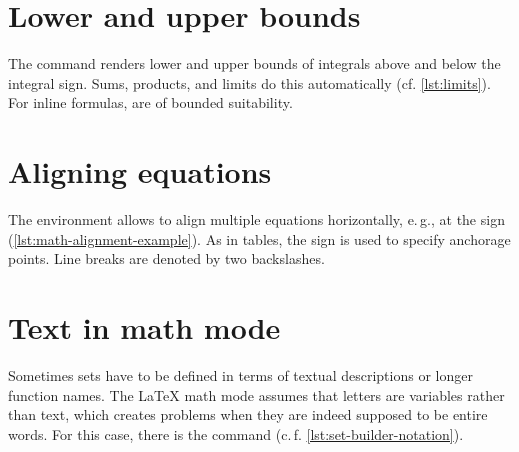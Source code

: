 \section{Lower and upper bounds}

The  command renders lower and upper bounds of integrals above and below the integral sign.
Sums, products, and limits do this 
automatically (cf. \cref{lst:limits}).
For inline formulas,  are of bounded suitability.


\section{Aligning equations}

The  environment allows to align multiple equations horizontally, e.\,g., at the \mono{=} sign (\cref{lst:math-alignment-example}).
As in tables, the \mono{\&} sign is used to specify anchorage points.
Line breaks are denoted by two backslashes.


\section{Text in math mode}

Sometimes sets have to be defined in terms of textual descriptions or longer function names.
The \LaTeX{} math mode assumes that letters are variables rather than text, which creates problems when they are indeed supposed to be entire words.
For this case, there is the  command (c.\,f. \cref{lst:set-builder-notation}).

